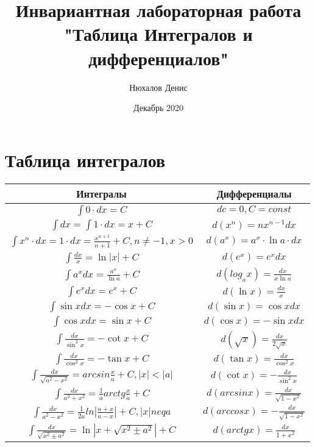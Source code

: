 \documentclass[a4paper,12pt]{article} %
\author{Нюхалов Денис}
\title{Инвариантная лабораторная работа\\"Таблица Интегралов и дифференциалов"}
\date{Декабрь 2020}
\begin{document}
\maketitle
\newpage
\section{Таблица интегралов}
\begin{table}
\begin{tabular}{|c|c|}
\hline 
Интегралы & Дифференциалы\\
\hline
$ \int{} 0 \cdot dx = C$  & $dc=0, C = const$\\
\hline
$ \int{} dx = \int{} 1\cdot dx = x + C$ & $d(x^n)= nx^{n-1}dx$\\
\hline
$ \int{} x^n \cdot dx = 1\cdot dx = \frac{x^{n+1}}{n+1}+C, n\neq-1, x>0$ & $d(a^x)=a^x\cdot \ln a \cdot dx$ \\
\hline
$ \int{} \frac{dx}{x}= \ln|x| + C $ & $d(e^x)=e^x dx$\\
\hline
$ \int{}a^x dx=\frac{a^x}{\ln a} + C$ & $d(log_a x)=\frac{dx}{x\ln a}$\\
\hline
$ \int{}e^x dx = e^x + C$ & $d(\ln x)=\frac{dx}{x}$\\
\hline
$ \int{} \sin xdx = -\cos x+C$ & $d(\sin x)=\cos xdx$\\
\hline
$ \int{} \cos xdx = \sin x +C $ & $d(\cos x)=-\sin xdx$\\
\hline
$ \int{} \frac{dx}{\sin ^2 x} = -\cot x + C$ & $d(\sqrt{x})=\frac{dx}{2\sqrt{x}}$\\
\hline
$ \int{} \frac{dx}{\cos ^2 x} = -\tan x + C$ & $d(\tan x)=\frac{dx}{\cos ^2 x}$\\
\hline
$ \int{} \frac{dx}{\sqrt{a^2-x^2}} = arcsin \frac{x}{a} + C, |x|<|a|$ & $d(\cot x)=-\frac{dx}{\sin ^2 x}$\\
\hline
$ \int{} \frac{dx}{a^2+x^2} = \frac{1}{a}arctg\frac{x}{a} + C$ & $d(arcsin x)=\frac{dx}{\sqrt{1-x^2}}$\\
\hline
$ \int{} \frac{dx}{a^2-x^2} = \frac{1}{2a}ln |\frac{a+x}{a-x}| + C, |x|neq a$ & $d(arccos x)=-\frac{dx}{\sqrt{1-x^2}}$\\
\hline
$ \int{} \frac{dx}{\sqrt{x^2\pm a^2}} = \ln |x+\sqrt{x^2\pm a^2}| + C$ & $d(arctg x)=\frac{dx}{1+x^2}$\\
\hline
\end{tabular}
\end{table}
\end{document}
